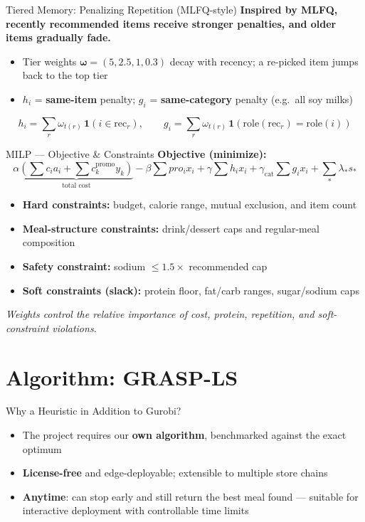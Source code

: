 \documentclass[10pt,aspectratio=169]{beamer}
\begin{document}
\begin{frame}{Tiered Memory: Penalizing Repetition (MLFQ-style)}
\textbf{Inspired by MLFQ, recently recommended items receive stronger penalties, and older items gradually fade.}
\medskip

\begin{itemize}
  \item Tier weights $\boldsymbol\omega=(5,2.5,1,0.3)$ decay with recency; a re-picked item jumps back to the top tier
  \item $h_i$ = \textbf{same-item} penalty;\; $g_i$ = \textbf{same-category} penalty (e.g.\ all soy milks)
\end{itemize}
\[ h_i = \sum_r \omega_{t(r)}\,\mathbf{1}(i \in \text{rec}_r),\qquad
   g_i = \sum_r \omega_{t(r)}\,\mathbf{1}(\mathrm{role}(\text{rec}_r)=\mathrm{role}(i)) \]
\end{frame}

\begin{frame}{MILP --- Objective \& Constraints}
\textbf{Objective (minimize):}
\[
\alpha \underbrace{\left(\sum c_i a_i + \sum c_k^{\text{promo}} y_k\right)}_{\text{total cost}}
- \beta \sum pro_i x_i
+ \gamma \sum h_i x_i + \gamma_{\text{cat}} \sum g_i x_i
+ \sum_{*} \lambda_* s_*
\]
\begin{itemize}
  \item \textbf{Hard constraints:} budget, calorie range, mutual exclusion, and item count
  \item \textbf{Meal-structure constraints:} drink/dessert caps and regular-meal composition
  \item \textbf{Safety constraint:} sodium $\le 1.5\times$ recommended cap
  \item \textbf{Soft constraints (slack):} protein floor, fat/carb ranges, sugar/sodium caps
\end{itemize}
\smallskip
{\small\emph{Weights control the relative importance of cost, protein, repetition, and soft-constraint violations.}}
\end{frame}

\section{Algorithm: GRASP-LS}
\begin{frame}{Why a Heuristic in Addition to Gurobi?}
\begin{itemize}
  \item The project requires our \textbf{own algorithm}, benchmarked against the exact optimum
  \item \textbf{License-free} and edge-deployable; extensible to multiple store chains
  \item \textbf{Anytime}: can stop early and still return the best meal found --- suitable for interactive deployment with controllable time limits
\end{itemize}
\end{frame}
\end{document}
